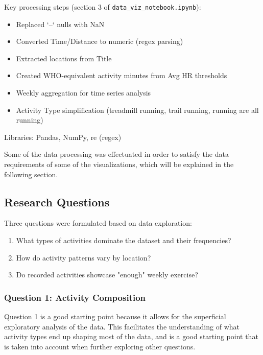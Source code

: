 \documentclass[a4paper,11pt]{article}
\begin{document}
\par
Key processing steps (section 3 of \texttt{data\_viz\_notebook.ipynb}):

\begin{itemize}
	\item Replaced `--` nulls with NaN
	\item Converted Time/Distance to numeric (regex parsing)
	\item Extracted locations from Title
	\item Created WHO-equivalent activity minutes\autocite[32]{WHO2020} from
	      Avg HR thresholds
	\item Weekly aggregation for time series analysis
	\item Activity Type simplification (treadmill running, trail running,
	      running are all running)
\end{itemize}

Libraries: Pandas\autocite{pandas}, NumPy\autocite{numpy}, re\autocite{re}
(regex)

Some of the data processing was effectuated in order to satisfy the data
requirements of some of the visualizations, which will be explained in the
following section.

\subsection{Research Questions}

Three questions were formulated based on data exploration:

\begin{enumerate}
	\item What types of activities dominate the dataset and their frequencies?
	\item How do activity patterns vary by location?
	\item Do recorded activities showcase "enough" weekly exercise?
\end{enumerate}

\subsubsection{Question 1: Activity Composition}\label{q1}

\par
Question 1 is a good starting point because it allows for the superficial
exploratory analysis of the data. This facilitates the understanding of what
activity types end up shaping most of the data, and is a good starting point
that is taken into account when further exploring other questions.
\end{document}
